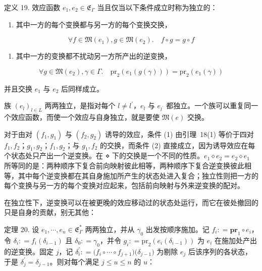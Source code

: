 定义 19. 效应函数 \(e _ { 1 } , e _ { 2 } \in \mathfrak { E } _ { \Gamma }\) 当且仅当以下条件成立时称为独立的：

\begin{enumerate}
\def\labelenumi{\arabic{enumi}.}
\tightlist
\item
  其中一方的每个变换都与另一方的每个变换交换，
\end{enumerate}

\[
\forall f \in \mathfrak { M } ( e _ { 1 } ) , g \in \mathfrak { M } ( e _ { 2 } ) . \quad f \circ g = g \circ f\tag{18}
\]

\begin{enumerate}
\def\labelenumi{\arabic{enumi}.}
\setcounter{enumi}{1}
\tightlist
\item
  其中一方的变换都不扰动另一方所产出的逆变换，
\end{enumerate}

\[
\forall g \in \mathfrak { M } ( e _ { 2 } ) , \gamma \in \Gamma . \quad \mathrm { p r } _ { 2 } ( e _ { 1 } ( g ( \gamma ) ) ) = \mathrm { p r } _ { 2 } ( e _ { 1 } ( \gamma ) )\tag{19}
\]

并且交换 \(e _ { 1 }\) 与 \(e _ { 2 }\) 后同样成立。

族 \(\left( e _ { l } \right) _ { l \in L }\) 两两独立，是指对每个 \(l \neq l ^ { \prime }\)，\(e _ { l }\) 与
\(e _ { l ^ { \prime } }\) 都独立。一个族可以重复同一个效应函数，而使一个效应与自身独立，就是要使
\(\mathfrak { M } ( e )\) 交换。

对于由对 \(( f _ { 1 } , g _ { 1 } )\) 与 \(( f _ { 2 } , g _ { 2 } )\) 诱导的效应，条件 (1) 由引理~18(1) 等价于四对
\(f _ { 1 } , f _ { 2 }\)；\(g _ { 1 } , g _ { 2 }\)；\(f _ { 1 } , g _ { 2 }\)；与 \(g _ { 1 } , f _ { 2 }\) 的交换，而条件 (2) 直接成立，因为诱导效应在每个状态处只产出一个逆变换。在 ⋄ 下的交换是一个不同的性质。\(e _ { 1 } \diamond e _ { 2 } = e _ { 2 } \diamond e _ { 1 }\) 所等同的是：两种顺序下复合前向映射彼此相等，两种顺序下复合逆变换彼此相等，其中每个逆变换都在其自身施加所产生的状态处进入复合；独立性则把一方的每个变换与另一方的每个变换对应起来，包括前向映射与外来逆变换的配对。

在独立性下，逆变换可以在被更晚的效应移动过的状态处运行，而它在彼处撤回的只是自身的贡献，别无其他：

定理 20. 设 \(e _ { 1 } , \cdots , e _ { n } \in \mathfrak { E } _ { \Gamma } ^ { * }\) 两两独立，并从
\(\gamma _ { 0 }\) 出发按顺序施加。记 \(f _ { i } : = \mathbf { p r } _ { 1 } \circ e _ { i }\)，令
\(\delta _ { i } : = f _ { i } ( \delta _ { i - 1 } )\) 且 \(\delta _ { 0 } : = \gamma _ { 0 }\)，并令
\(g _ { i } : = \mathrm { p r } _ { 2 } ( e _ { i } ( \delta _ { i - 1 } ) )\) 为 \(e _ { i }\) 在施加处产出的逆变换。固定
\(j\)，记 \(\delta _ { i } ^ { \prime } : = \big ( f _ { i } \circ \cdots \circ f _ { j + 1 } \big ) \big ( \delta _ { j - 1 } \big )\) 为剔除 \(e _ { j }\) 后该序列的各状态，于是
\(\delta _ { j } ^ { \prime } = \delta _ { j - 1 }\)。则对每个满足 \(j \leq u \leq n\) 的 \(u\)：


